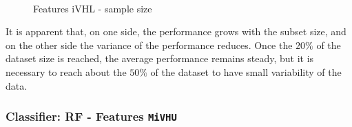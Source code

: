 \begin{figure}[!htb]
  \centering
    \\
    \caption{Features iVHL - sample size}
    \label{ch6:fig12}
\end{figure}

It is apparent that, on one side, the performance grows with the subset size, and on the other side the variance of the performance reduces.
Once the $20\%$ of the dataset size is reached, the average performance remains steady, but it is necessary to reach about the $50\%$ of the dataset to
have small variability of the data.

\vspace{0.5cm}

\subsubsection{Classifier: RF - Features \texttt{MiVHU}}


